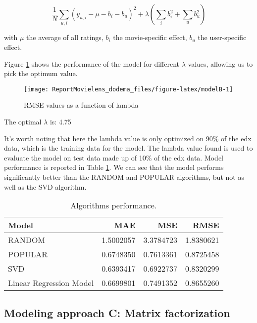 \documentclass[
]{article}
\begin{document}
\begin{equation}
    \frac{1}{N}\sum_{u,i}\left(y_{u,i}-\mu-b_{i}-b_{u}\right)^{2}+\lambda \left( \sum_{i} b_{i}^{2} + \sum_{u} b_{u}^{2}\right)
    \label{eq:modelB}
\end{equation}

with \(\mu\) the average of all ratings, \(b_{i}\) the movie-specific effect, \(b_{u}\) the user-specific effect.

Figure \ref{fig:modelB} shows the performance of the model for different \(\lambda\) values, allowing us to pick the optimum value.

\begin{figure}[H]

{\centering \texttt{[image: ReportMovielens\_dodema\_files/figure-latex/modelB-1]} 

}

\caption{ RMSE values as a function of lambda }\label{fig:modelB}
\end{figure}

The optimal \(\lambda\) is:
4.75

It's worth noting that here the lambda value is only optimized on 90\% of the edx data, which is the training data for the model. The lambda value found is used to evaluate the model on test data made up of 10\% of the edx data. Model performance is reported in Table \ref{tab:modelB2}. We can see that the model performs significantly better than the RANDOM and POPULAR algorithms, but not as well as the SVD algorithm.

\begin{table}[H]
\centering
\caption{\label{tab:modelB2}Algorithms performance.}
\centering
\begin{tabular}[t]{lrrr}
\toprule
Model & MAE & MSE & RMSE\\
\midrule
RANDOM & 1.5002057 & 3.3784723 & 1.8380621\\
POPULAR & 0.6748350 & 0.7613361 & 0.8725458\\
SVD & 0.6393417 & 0.6922737 & 0.8320299\\
Linear Regression Model & 0.6699801 & 0.7491352 & 0.8655260\\
\bottomrule
\end{tabular}
\end{table}

\subsection{Modeling approach C: Matrix factorization}\label{modeling-approach-c-matrix-factorization}
\end{document}
